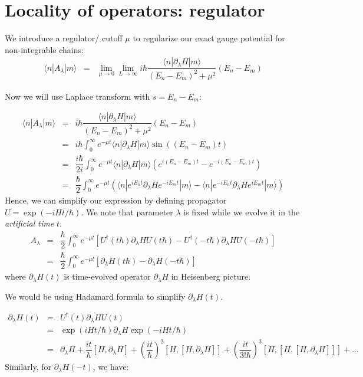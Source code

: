 \documentclass[11pt,a4paper]{article}
\begin{document}
\section{Locality of operators: regulator}
We introduce a regulator/ cutoff $\mu$ to regularize our exact gauge potential for non-integrable chains:
\begin{eqnarray}
\langle n | A_{\lambda} | m \rangle &=& \lim_{\mu \rightarrow 0} \lim_{L \rightarrow \infty } i \hbar \dfrac{\langle n | \partial_{\lambda}H  | m \rangle}{(E_n-E_m)^2 + \mu^2} (E_n-E_m) 
\end{eqnarray}

Now we will use Laplace transform with $s= E_n-E_m$:

\begin{eqnarray}
\langle n | A_{\lambda} | m \rangle &=&  i \hbar \dfrac{\langle n | \partial_{\lambda}H  | m \rangle}{(E_n-E_m)^2 + \mu^2} (E_n-E_m) \\
&=& i \hbar  \int^{\infty}_{0} e^{-\mu t} \langle n | \partial_{\lambda}H  | m \rangle \sin((E_n-E_m)t) \\
&=& \dfrac{i \hbar}{2i}  \int^{\infty}_{0} e^{-\mu t} \langle n | \partial_{\lambda}H  | m \rangle \left( e^{i(E_n-E_m)t} - e^{-i(E_n-E_m)t} \right) \\
&=& \dfrac{ \hbar}{2}  \int^{\infty}_{0} e^{-\mu t}  \left(  \langle n | e^{iE_nt} \partial_{\lambda}H   e^{-i E_m t} | m \rangle  -  \langle n |e^{-i E_n t}  \partial_{\lambda}H  e^{ i E_mt} | m \rangle  \right) 
\end{eqnarray}
Hence, we can simplify our expression by defining propagator  $U= \exp(-i H t/ \hbar)$. We note that parameter $\lambda$ is fixed while we evolve it in the \textit{artificial time} $t$.
\begin{eqnarray}
A_{\lambda} &=& \dfrac{\hbar}{2 }\int_0^{\infty} e^{-\mu t} [U^{\dagger}(t \hbar) \partial_{\lambda} H U(t  \hbar) - U^{\dagger}(-t  \hbar) \partial_{\lambda}H U(-t \hbar)]  \\
&=& \dfrac{\hbar}{2 }\int_0^{\infty} e^{-\mu t} [ \partial_{\lambda} H (t \hbar) -  \partial_{\lambda}H (-t  \hbar)  ]  
\end{eqnarray}
where $\partial_{\lambda}H (t)$ is time-evolved operator $\partial_{\lambda}H$ in Heisenberg picture.

We would be using  Hadamard formula to simplify $\partial_{\lambda}H (t)$.

\begin{eqnarray}
\partial_{\lambda}H (t) &=& U^{\dagger}(t ) \partial_{\lambda} H U(t ) \\
&=& \exp(i H t/ \hbar) \partial_{\lambda} H \exp(-i H t/ \hbar)  \\
&=&  \partial_{\lambda} H  + \dfrac{i t}{ \hbar} [H, \partial_{\lambda} H] + \left(\dfrac{i t}{ \hbar}\right)^2 [H,[H, \partial_{\lambda} H]]  + \left(\dfrac{i t}{  3! \hbar}\right)^3 [H,[H,[H, \partial_{\lambda} H]]]   + \ldots
\end{eqnarray}
Similarly,  for $\partial_{\lambda}H (-t)$, we have:
\end{document}
